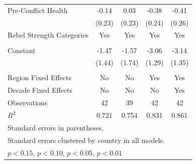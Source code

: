 \documentclass[12pt, letterpaper]{article}
\begin{document}
\begin{table}[htbp]
\begin{small}
\begin{tabular}{l*{4}{c}}
Pre-Conflict Health &       -0.14         &        0.03         &       -0.38\sym{+}  &       -0.41\sym{+}  \\
                    &      (0.23)         &      (0.23)         &      (0.24)         &      (0.26)         \\
Rebel Strength Categories      &         Yes  &         Yes &       Yes &       Yes  \\
                    &          &              &               &               \\
Constant            &       -1.47         &       -1.57         &       -3.06\sym{**} &       -3.14\sym{**} \\
                    &      (1.44)         &      (1.74)         &      (1.29)         &      (1.35)         \\
\\
Region Fixed Effects               &      No               &         No            &         Yes            &      Yes     \\
Decade Fixed Effects               &      No               &         No            &         No            &      Yes     \\                    
\hline
Observations        &          42         &          39         &          42         &          42         \\
\(R^{2}\)           &       0.721         &       0.754         &       0.831         &       0.861         \\
\hline\hline
\multicolumn{5}{l}{\footnotesize Standard errors in parentheses.}\\
\multicolumn{5}{l}{\footnotesize Standard errors clustered by country in all models.}\\
\multicolumn{5}{l}{\footnotesize \sym{+} \(p<0.15\), \sym{*} \(p<0.10\), \sym{**} \(p<0.05\), \sym{***} \(p<0.01\)}\\
\end{tabular}
\end{small}
\end{table}
\end{document}
